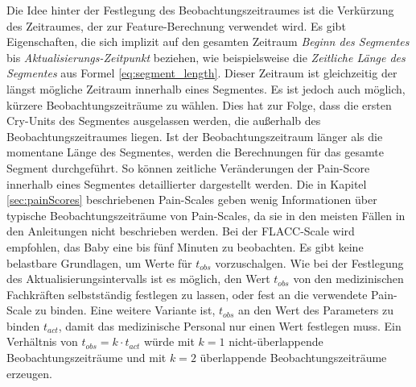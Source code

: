 Die Idee hinter der Festlegung des Beobachtungszeitraumes ist die Verkürzung des Zeitraumes, der zur Feature-Berechnung verwendet wird. Es gibt Eigenschaften, die sich implizit auf den gesamten Zeitraum \emph{Beginn des Segmentes} bis \emph{Aktualisierungs-Zeitpunkt} beziehen, wie beispielsweise die \emph{Zeitliche Länge des Segmentes} aus Formel \ref{eq:segment_length}. Dieser Zeitraum ist gleichzeitig der längst mögliche Zeitraum innerhalb eines Segmentes. Es ist jedoch auch möglich, kürzere Beobachtungszeiträume zu wählen. Dies hat zur Folge, dass die ersten Cry-Units des Segmentes ausgelassen werden, die außerhalb des Beobachtungszeitraumes liegen. Ist der Beobachtungszeitraum länger als die momentane Länge des Segmentes, werden die Berechnungen für das gesamte Segment durchgeführt. So können zeitliche Veränderungen der Pain-Score innerhalb eines Segmentes detaillierter dargestellt werden. Die in Kapitel \ref{sec:painScores} beschriebenen Pain-Scales geben wenig Informationen über \glqq typische Beobachtungszeiträume von Pain-Scales\grqq{}, da sie in den meisten Fällen in den Anleitungen nicht beschrieben werden. Bei der FLACC-Scale wird empfohlen, das Baby eine bis fünf Minuten zu beobachten.\cite{flacc} Es gibt keine belastbare Grundlagen, um Werte für $t_{obs}$ vorzuschalgen. Wie bei der Festlegung des Aktualisierungsintervalls ist es möglich, den Wert $t_{obs}$ von den medizinischen Fachkräften selbstständig festlegen zu lassen, oder fest an die verwendete Pain-Scale zu binden. Eine weitere Variante ist, $t_{obs}$ an den Wert des Parameters zu binden $t_{act}$, damit das medizinische Personal nur einen Wert festlegen muss. Ein Verhältnis von $t_{obs} = k \cdot t_{act}$ würde mit $k=1$ nicht-überlappende Beobachtungszeiträume und  mit $k=2$ überlappende Beobachtungszeiträume erzeugen.